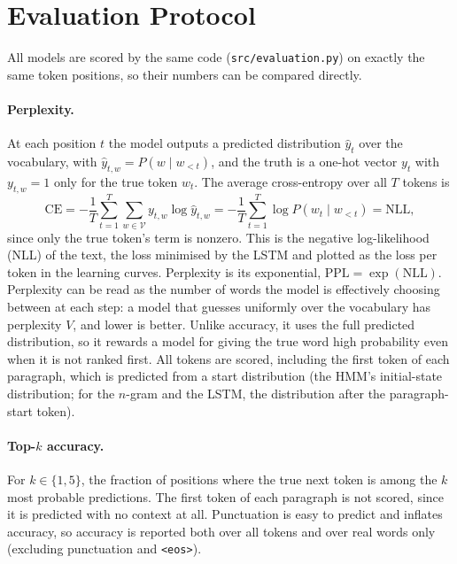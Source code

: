 \documentclass[11pt]{article}
\begin{document}
\section{Evaluation Protocol}
\label{sec:eval}

All models are scored by the same code (\texttt{src/evaluation.py}) on
exactly the same token positions, so their numbers can be compared
directly. 

\paragraph{Perplexity.} At each position $t$ the model outputs a
predicted distribution $\hat y_t$ over the vocabulary, with
$\hat y_{t,w} = P(w \mid w_{<t})$, and the truth is a one-hot vector
$y_t$ with $y_{t,w} = 1$ only for the true token $w_t$. The average
cross-entropy over all $T$ tokens is
\[
\mathrm{CE} = -\frac{1}{T}\sum_{t=1}^{T} \sum_{w \in \mathcal{V}}
y_{t,w} \log \hat y_{t,w}
= -\frac{1}{T}\sum_{t=1}^{T} \log P(w_t \mid w_{<t}) = \mathrm{NLL},
\]
since only the true token's term is nonzero. This is the negative
log-likelihood (NLL) of the text, the loss minimised by the LSTM and
plotted as the loss per token in the learning curves. Perplexity is its
exponential, $\mathrm{PPL} = \exp(\mathrm{NLL})$.
Perplexity can be read as the number of words the model is effectively
choosing between at each step: a model that guesses uniformly over the
vocabulary has perplexity $V$, and lower is better. Unlike accuracy, it
uses the full predicted distribution, so it rewards a model for giving
the true word high probability even when it is not ranked first. All
tokens are scored, including the first token of each paragraph, which is
predicted from a start distribution (the HMM's initial-state
distribution; for the $n$-gram and the LSTM, the distribution after the
paragraph-start token).

\paragraph{Top-$k$ accuracy.} For $k \in \{1, 5\}$, the fraction of
positions where the true next token is among the $k$ most probable
predictions. The first token of each paragraph is not scored, since it is
predicted with no context at all. Punctuation is easy to predict and
inflates accuracy, so accuracy is reported both over all tokens and over
real words only (excluding punctuation and \texttt{<eos>}).
\end{document}
